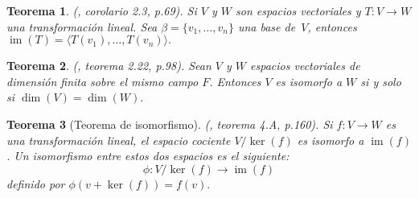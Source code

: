 \documentclass[12pt]{book}
\newtheorem{theorem}{Teorema}[section]
\theoremstyle{definition}
\newtheorem{definition}[theorem]{Definición}
\DeclareMathOperator{\im}{im}
\newcounter{in}
\newcounter{ini}
\begin{document}
\begin{theorem}{\normalfont (\cite{friedberg1982algebra}, corolario 2.3, p.69)}.
  \label{imT}
  Si $V$ y $W$ son espacios vectoriales y $T:V \rightarrow W$
  una transformación lineal. Sea $\beta=\{v_{1},\ldots,v_{n}\}$ una base de~$V$,
  entonces $\im(T)=\langle T(v_{1}),\ldots,T(v_{n})\rangle.$  
\end{theorem}

\begin{theorem}{\normalfont (\cite{friedberg1982algebra}, teorema 2.22, p.98)}.
  \label{esp-isomorfos}
  Sean $V$ y $W$ espacios vectoriales de dimensión finita sobre el
  mismo campo $F$. Entonces $V$ es isomorfo a $W$
  si y solo si $\dim (V)=\dim(W).$
\end{theorem}

\begin{theorem}[Teorema de isomorfismo]{\normalfont (\cite{herstein1990algebra}, teorema 4.A, p.160)}.
  \label{teorema-isomorfismo-esp}
  Si $f:V\rightarrow W$ es una transformación lineal, el espacio
  cociente $V/\ker(f)$ es isomorfo a $\im(f)$. Un isomorfismo entre estos dos
  espacios es el siguiente:
  $$\phi:V/\ker(f)\rightarrow \im(f)$$
  definido por $\phi(v+\ker(f))=f(v).$
\end{theorem}

\end{document}
